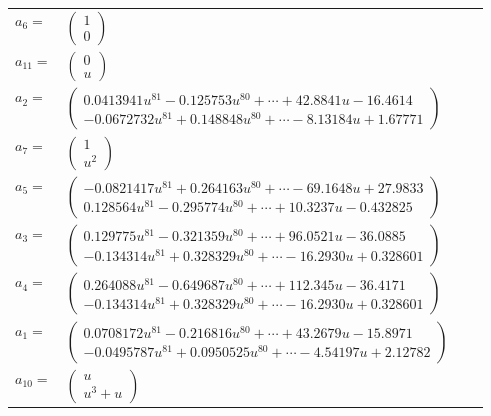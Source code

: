 \documentclass[1p]{elsarticle_modified}
\theoremstyle{definition}
\begin{document}
\begin{tabular}{m{7pt} m{180pt} m{7pt} m{180pt} }
\flushright $a_{6}=$&$\begin{pmatrix}1\\0\end{pmatrix}$ \\
\flushright $a_{11}=$&$\begin{pmatrix}0\\u\end{pmatrix}$ \\
\flushright $a_{2}=$&$\begin{pmatrix}0.0413941 u^{81}-0.125753 u^{80}+\cdots+42.8841 u-16.4614\\-0.0672732 u^{81}+0.148848 u^{80}+\cdots-8.13184 u+1.67771\end{pmatrix}$ \\
\flushright $a_{7}=$&$\begin{pmatrix}1\\u^2\end{pmatrix}$ \\
\flushright $a_{5}=$&$\begin{pmatrix}-0.0821417 u^{81}+0.264163 u^{80}+\cdots-69.1648 u+27.9833\\0.128564 u^{81}-0.295774 u^{80}+\cdots+10.3237 u-0.432825\end{pmatrix}$ \\
\flushright $a_{3}=$&$\begin{pmatrix}0.129775 u^{81}-0.321359 u^{80}+\cdots+96.0521 u-36.0885\\-0.134314 u^{81}+0.328329 u^{80}+\cdots-16.2930 u+0.328601\end{pmatrix}$ \\
\flushright $a_{4}=$&$\begin{pmatrix}0.264088 u^{81}-0.649687 u^{80}+\cdots+112.345 u-36.4171\\-0.134314 u^{81}+0.328329 u^{80}+\cdots-16.2930 u+0.328601\end{pmatrix}$ \\
\flushright $a_{1}=$&$\begin{pmatrix}0.0708172 u^{81}-0.216816 u^{80}+\cdots+43.2679 u-15.8971\\-0.0495787 u^{81}+0.0950525 u^{80}+\cdots-4.54197 u+2.12782\end{pmatrix}$ \\
\flushright $a_{10}=$&$\begin{pmatrix}u\\u^3+u\end{pmatrix}$ \\

\end{tabular}
\end{document}
